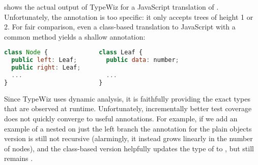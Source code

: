  shows the actual output of TypeWiz for a JavaScript translation of .
Unfortunately, the annotation is too specific: it only accepts trees of height 1 or 2.
For fair comparison, even a class-based translation to JavaScript with
a common  method yields a shallow annotation:
\begin{lstlisting}[language=JavaScript]
class Node {              class Leaf { 
  public left: Leaf;        public data: number;
  public right: Leaf;
  ...                       ...
}                         }
\end{lstlisting}

Since TypeWiz uses dynamic analysis, it is faithfully
providing the exact types that are observed at runtime.
Unfortunately, incrementally better test coverage does not quickly converge
to useful annotations.
For example, if we add an example of a nested 
on just the left branch
the annotation for the plain objects version is still not recursive (alarmingly, it instead
grows linearly in the number of nodes), and the class-based
version helpfully updates the type of  to ,
but  still remains .


